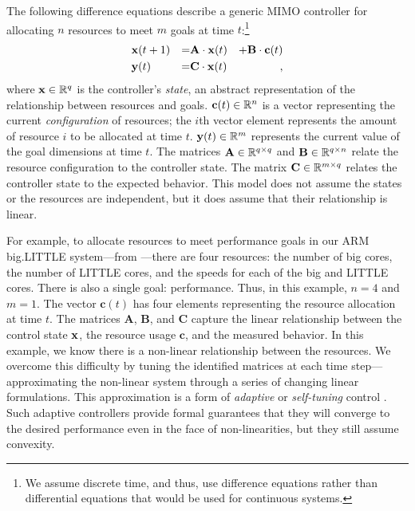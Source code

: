 The following difference equations describe a generic MIMO controller
for allocating $n$ resources to meet $m$ goals at time
$t$:\footnote{We assume discrete time, and thus, use difference
  equations rather than differential equations that would be used for
  continuous systems.}
\begin{equation}
\begin{aligned}
&\mathbf{x}(t+1) &=& \mathbf{A} \cdot \mathbf{x}(t)& + \mathbf{B} \cdot \mathbf{c}(t)\\
&\mathbf{y}(t)   &=& \mathbf{C} \cdot \mathbf{x}(t)&,
\end{aligned}
\label{eqn:system:mimo}
\end{equation}
where $\mathbf{x} \in \mathbb{R}^{q}$ is the controller's \emph{state}, an abstract
representation of the relationship between resources and goals.
$\mathbf{c}(t) \in \mathbb{R}^n$ is a vector representing the current
\emph{configuration} of resources; \ie{} the $i$th vector element
represents the amount of resource $i$ to be allocated at time $t$.
$\mathbf{y}(t) \in \mathbb{R}^{m}$ represents the current value of the goal dimensions
at time $t$. The matrices $\mathbf{A} \in \mathbb{R}^{q \times q}$ and
$\mathbf{B} \in \mathbb{R}^{q \times n}$ relate the resource configuration to
the controller state.  The matrix $\mathbf{C} \in \mathbb{R}^{m \times q}$
relates the controller state to the expected behavior.  This model
does not assume the states or the resources are independent, but it
does assume that their relationship is linear.

For example, to allocate resources to meet performance goals in our
ARM big.LITTLE system---from ---there are four
resources: the number of big cores, the number of LITTLE cores, and
the speeds for each of the big and LITTLE cores.  There is also a
single goal: performance.  Thus, in this example, $n=4$ and $m=1$. The
vector $\mathbf{c}(t)$ has four elements representing the resource
allocation at time $t$.  The matrices $\mathbf{A}$, $\mathbf{B}$, and
$\mathbf{C}$ capture the linear relationship between the control state
$\mathbf{x}$, the resource usage $\mathbf{c}$, and the measured behavior.  In
this example, we know there is a non-linear relationship between the
resources.  We overcome this difficulty by tuning the identified
matrices at each time step---approximating the non-linear system
through a series of changing linear formulations.  This approximation
is a form of \emph{adaptive} or \emph{self-tuning} control
\cite{AdaptiveControl}.  Such adaptive controllers provide formal
guarantees that they will converge to the desired performance even in
the face of non-linearities, but they still assume convexity.

